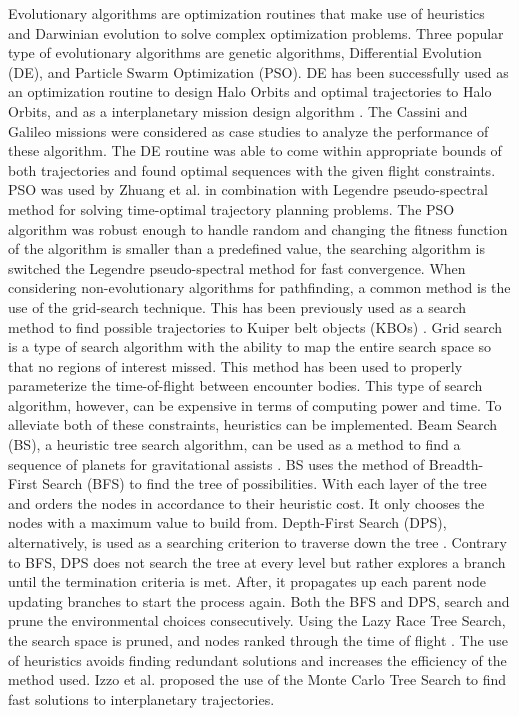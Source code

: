 \documentclass[letterpaper, preprint, paper,11pt]{AAS}	%
\begin{document}
Evolutionary algorithms are optimization routines that make use of heuristics and Darwinian evolution to solve complex optimization problems. Three popular type of evolutionary algorithms are genetic algorithms, Differential Evolution (DE), and Particle Swarm Optimization (PSO). DE has been successfully used as an optimization routine to design Halo Orbits and optimal trajectories to Halo Orbits, and as a interplanetary mission design algorithm \cite{Nath2016, Olds2007}.  The Cassini and Galileo missions were considered as case studies to analyze the performance of these algorithm. The DE routine was able to come within appropriate bounds of both trajectories and found optimal sequences with the given flight constraints. PSO was used by Zhuang et al.\cite{Zhuang2014} in combination with Legendre pseudo-spectral method for solving time-optimal trajectory planning problems. The PSO algorithm was robust enough to handle random and changing the fitness function of the algorithm is smaller than a predefined value, the searching algorithm is switched the Legendre pseudo-spectral method for fast convergence. When considering non-evolutionary algorithms for pathfinding, a common method is the use of the grid-search technique. This has been previously used as a search method to find possible trajectories to Kuiper belt objects (KBOs) \cite{Penas2019}. Grid search is a type of search algorithm with the ability to map the entire search space so that no regions of interest missed. This method has been used to properly parameterize the time-of-flight between encounter bodies. This type of search algorithm, however, can be expensive in terms of computing power and time. To alleviate both of these constraints, heuristics can be implemented. Beam Search (BS), a heuristic tree search algorithm, can be used as a method to find a sequence of planets for gravitational assists \cite{Penas2019}. BS uses the method of Breadth-First Search (BFS) to find the tree of possibilities. With each layer of the tree and orders the nodes in accordance to their heuristic cost. It only chooses the nodes with a maximum value to build from. Depth-First Search (DPS), alternatively, is used as a searching criterion to traverse down the tree \cite{Izzo2013}. Contrary to BFS, DPS does not search the tree at every level but rather explores a branch until the termination criteria is met. After, it propagates up each parent node updating branches to start the process again. Both the BFS and DPS, search and prune the environmental choices consecutively. Using the Lazy Race Tree Search, the search space is pruned, and nodes ranked through the time of flight \cite{Izzo2013}. The use of heuristics avoids finding redundant solutions and increases the efficiency of the method used. Izzo et al. \cite{Hennes2015} proposed the use of the Monte Carlo Tree Search to find fast solutions to interplanetary trajectories.
\end{document}
